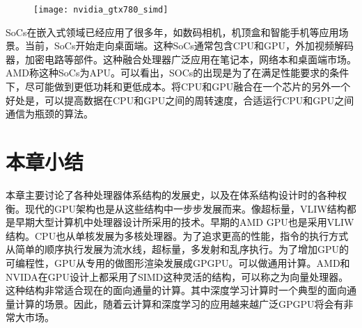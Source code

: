 \begin{figure}[htbp]
	\centering
	\texttt{[image: nvidia\_gtx780\_simd]}
	\label{fig:nvidia_gtx780_simd}
\end{figure}

SoCs在嵌入式领域已经应用了很多年，如数码相机，机顶盒和智能手机等应用场景。当前，SoCs开始走向桌面端。这种SoCs通常包含CPU和GPU，外加视频解码器，加密电路等部件。这种融合处理器广泛应用在笔记本，网络本和桌面端市场。AMD称这种SoCs为APU。可以看出，SOCs的出现是为了在满足性能要求的条件下，尽可能做到更低功耗和更低成本。将CPU和GPU融合在一个芯片的另外一个好处是，可以提高数据在CPU和GPU之间的周转速度，合适运行CPU和GPU之间通信为瓶颈的算法。

\section{本章小结}
本章主要讨论了各种处理器体系结构的发展史，以及在体系结构设计时的各种权衡。现代的GPU架构也是从这些结构中一步步发展而来。像超标量，VLIW结构都是早期大型计算机中处理器设计所采用的技术。早期的AMD GPU也是采用VLIW结构。CPU也从单核发展为多核处理器。为了追求更高的性能，指令的执行方式从简单的顺序执行发展为流水线，超标量，多发射和乱序执行。为了增加GPU的可编程性，GPU从专用的做图形渲染发展成GPGPU。可以做通用计算。AMD和NVIDA在GPU设计上都采用了SIMD这种灵活的结构，可以称之为向量处理器。这种结构非常适合现在的面向通量的计算。其中深度学习计算时一个典型的面向通量计算的场景。因此，随着云计算和深度学习的应用越来越广泛GPGPU将会有非常大市场。

